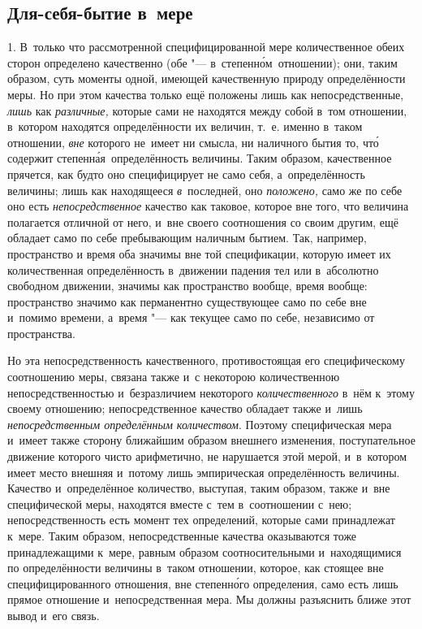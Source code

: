 \subsection{Для-себя-бытие в~мере}

1. В~только что рассмотренной специфицированной мере количественное обеих
сторон определено качественно (обе "--- в~степенн\'{о}м~отношении); они, таким
образом, суть моменты одной, имеющей качественную природу определённости меры.
Но при этом качества только ещё положены лишь как непосредственные, {\em лишь}
как {\em различные,} которые сами не находятся между собой в~том отношении,
в~котором находятся определённости их величин, т.~е. именно в~таком отношении,
{\em вне} которого не~имеет ни смысла, ни наличного бытия то, чт\'{о} содержит
степенн\'{а}я~определённость величины. Таким образом, качественное прячется,
как будто оно специфицирует не само себя, а~определённость величины; лишь как
находящееся {\em в}~последней, оно {\em положено,} само же по себе оно есть
{\em непосредственное} качество как таковое, которое вне того, что величина
полагается отличной от него, и~вне своего соотношения со своим другим, ещё
обладает само по себе пребывающим наличным бытием. Так, например, пространство
и время оба значимы вне той спецификации, которую имеет их количественная
определённость в~движении падения тел или в~абсолютно свободном движении,
значимы как пространство вообще, время вообще: пространство значимо как
перманентно существующее само по себе вне и~помимо времени, а~время "--- как
текущее само по себе, независимо от пространства.

Но эта непосредственность качественного, противостоящая его специфическому
соотношению меры, связана также и~с некоторою количественною
непосредственностью и~безразличием некоторого {\em количественного} в~нём
к~этому своему отношению; непосредственное качество обладает также и~лишь
{\em непосредственным определённым количеством}. Поэтому специфическая мера
и~имеет также сторону ближайшим образом внешнего изменения, поступательное
движение которого чисто арифметично, не нарушается этой мерой, и~в~котором
имеет место внешняя и~потому лишь эмпирическая определённость величины.
Качество и~определённое количество, выступая, таким образом, также и~вне
специфической меры, находятся вместе с~тем в~соотношении с~нею;
непосредственность есть момент тех определений, которые сами принадлежат
к~мере. Таким образом, непосредственные качества оказываются тоже
принадлежащими к~мере, равным образом соотносительными и~находящимися по
определённости величины в~таком отношении, которое, как стоящее вне
специфицированного отношения, вне степенн\'{о}го определения, само есть лишь
прямое отношение и~непосредственная мера. Мы должны разъяснить ближе этот
вывод и~его связь.

